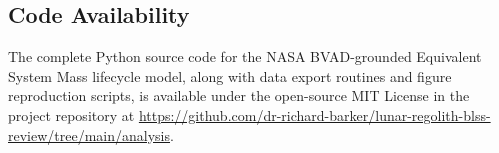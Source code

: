 \subsection*{Code Availability}
The complete Python source code for the NASA BVAD-grounded Equivalent System Mass lifecycle model, along with data export routines and figure reproduction scripts, is available under the open-source MIT License in the project repository at \url{https://github.com/dr-richard-barker/lunar-regolith-blss-review/tree/main/analysis}.
